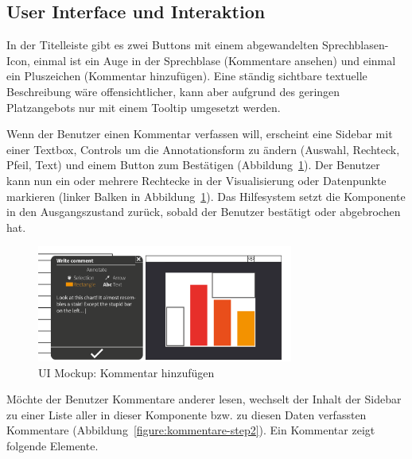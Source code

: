 \documentclass[
	headsepline,
	footsepline,
	fontsize=12pt,
	bibliography=totoc
]{scrbook}
\begin{document}
\subsection{User Interface und Interaktion}
\label{section:konzeption:kommentare:ui}


In der Titelleiste gibt es zwei Buttons mit einem abgewandelten Sprechblasen-Icon, einmal ist ein Auge in der Sprechblase (Kommentare ansehen) und einmal ein Pluszeichen (Kommentar hinzufügen). Eine ständig sichtbare textuelle Beschreibung wäre offensichtlicher, kann aber aufgrund des geringen Platzangebots nur mit einem Tooltip umgesetzt werden.

Wenn der Benutzer einen Kommentar verfassen will, erscheint eine Sidebar mit einer Textbox, Controls um die Annotationsform zu ändern (Auswahl, Rechteck, Pfeil, Text) und einem Button zum Bestätigen (Abbildung~\ref{figure:kommentare-step4}). Der Benutzer kann nun ein oder mehrere Rechtecke in der Visualisierung oder Datenpunkte markieren (linker Balken in Abbildung~\ref{figure:kommentare-step4}). Das Hilfesystem setzt die Komponente in den Ausgangszustand zurück, sobald der Benutzer bestätigt oder abgebrochen hat.

\begin{figure}[htbp]
   \centering
   \includegraphics[width=0.75\textwidth]{images/konzeption-kommentare-step4.png}
   \caption{UI Mockup: Kommentar hinzufügen}
   \label{figure:kommentare-step4}
\end{figure}

Möchte der Benutzer Kommentare anderer lesen, wechselt der Inhalt der Sidebar zu einer Liste aller in dieser Komponente bzw. zu diesen Daten verfassten Kommentare (Abbildung~\ref{figure:kommentare-step2}). Ein Kommentar zeigt folgende Elemente.
\end{document}

